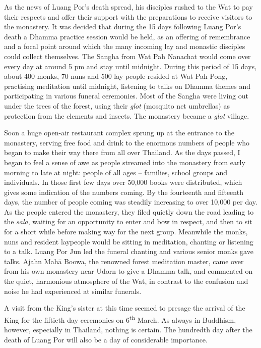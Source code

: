 As the news of Luang Por's death spread, his disciples rushed to the Wat
to pay their respects and offer their support with the preparations to
receive visitors to the monastery. It was decided that during the 15
days following Luang Por's death a Dhamma practice session would be
held, as an offering of remembrance and a focal point around which the
many incoming lay and monastic disciples could collect themselves. The
Sangha from Wat Pah Nanachat would come over every day at around 5 pm
and stay until midnight. During this period of 15 days, about 400 monks, 
70 nuns and 500 lay people resided at Wat Pah Pong, practising
meditation until midnight, listening to talks on Dhamma themes and
participating in various funeral ceremonies. Most of the Sangha were
living out under the trees of the forest, using their \emph{glot}
 (mosquito net umbrellas) as protection from the elements and insects. 
The monastery became a \emph{glot} village. 

Soon a huge open-air restaurant complex sprung up at the entrance to the
monastery, serving free food and drink to the enormous numbers of people
who began to make their way there from all over Thailand. As the days
passed, I began to feel a sense of awe as people streamed into the
monastery from early morning to late at night: people of all ages --
families, school groups and individuals. In those first few days over
50,000 books were distributed, which gives some indication of the
numbers coming. By the fourteenth and fifteenth days, the number of
people coming was steadily increasing to over 10,000 per day. As the
people entered the monastery, they filed quietly down the road leading
to the \emph{sāla}, waiting for an opportunity to enter and bow in
respect, and then to sit for a short while before making way for the
next group. Meanwhile the monks, nuns and resident laypeople would be
sitting in meditation, chanting or listening to a talk. Luang Por Jun
led the funeral chanting and various senior monks gave talks. Ajahn Mahā
Boowa, the renowned forest meditation master, came over from his own
monastery near Udorn to give a Dhamma talk, and commented on the quiet, 
harmonious atmosphere of the Wat, in contrast to the confusion and noise
he had experienced at similar funerals. 

A visit from the King's sister at this time seemed to presage the
arrival of the King for the fiftieth day ceremonies on 6\textsuperscript{th} March. As
always in Buddhism, however, especially in Thailand, nothing is certain. 
The hundredth day after the death of Luang Por will also be a day of
considerable importance. 

